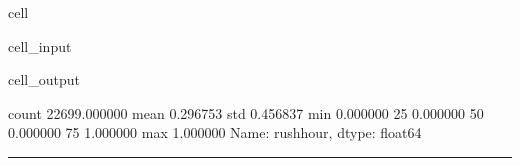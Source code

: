\documentclass[letterpaper,10pt,english]{sphinxmanual}
\begin{document}
\begin{sphinxuseclass}{cell}
\begin{sphinxuseclass}{cell_input}
\begin{sphinxVerbatim}[commandchars=\\\{\}]
\PYG{p}{[}\PYG{p}{]}
\end{sphinxVerbatim}

\end{sphinxuseclass}
\begin{sphinxuseclass}{cell_output}
\begin{sphinxVerbatim}[commandchars=\\\{\}]
count    22699.000000
mean         0.296753
std          0.456837
min          0.000000
25\PYGZpc{}          0.000000
50\PYGZpc{}          0.000000
75\PYGZpc{}          1.000000
max          1.000000
Name: rush\PYGZus{}hour, dtype: float64
\end{sphinxVerbatim}

\end{sphinxuseclass}
\end{sphinxuseclass}

\bigskip\hrule\bigskip


\sphinxAtStartPar
{}
\end{document}
